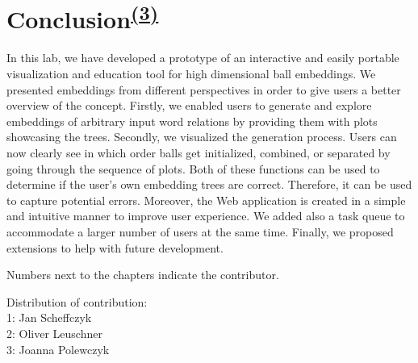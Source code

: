 \section[Conclusion]{Conclusion\textsuperscript{\hyperref[Joanna]{(3)}}}
In this lab, we have developed a prototype of an interactive and easily portable visualization and education tool for high dimensional ball embeddings. We presented embeddings from different perspectives in order to give users a better overview of the concept. Firstly, we enabled users to generate and explore embeddings of arbitrary input word relations by providing them with plots showcasing the trees. Secondly, we visualized the generation process. Users can now clearly see in which order balls get initialized, combined, or separated by going through the sequence of plots. Both of these functions can be used to determine if the user's own embedding trees are correct. Therefore, it can be used to capture potential errors. Moreover, the Web application is created in a simple and intuitive manner to improve user experience. We added also a task queue to accommodate a larger number of users at the same time. Finally, we proposed extensions to help with future development. 





\newpage

Numbers next to the chapters indicate the contributor.
\vspace{0.5in}

Distribution of contribution:\\
1: Jan Scheffczyk \label{Jan}\\
2: Oliver Leuschner \label{Oliver}\\
3: Joanna Polewczyk \label{Joanna}\\


